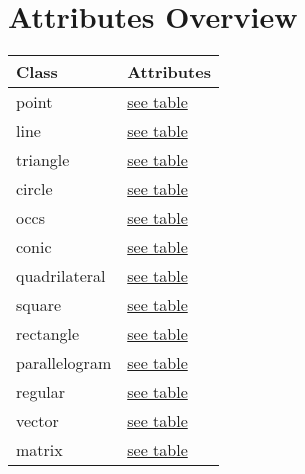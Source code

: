 \documentclass[
  DIV=14,
  fontsize=10,
  index=totoc,
  twoside,
  cadre,
  headings=small
]{tkz-doc}
\begin{document}
\clearpage
\listofoverviews

\clearpage
\section*{Attributes Overview}
\begin{tabular}{ll}
\textbf{Class} & \textbf{Attributes} \\
\hline
point & \hyperref[point:attributes]{see table}       \\
line & \hyperref[line:attributes]{see table}         \\
triangle & \hyperref[triangle:attributes]{see table} \\
circle & \hyperref[circle:attributes]{see table}     \\
occs & \hyperref[occs:attributes]{see table}         \\
conic & \hyperref[conic:attributes]{see table}       \\
quadrilateral & \hyperref[quadrilateral:attributes]{see table}\\
square & \hyperref[square:attributes]{see table}     \\
rectangle & \hyperref[rectangle:attributes]{see table}\\
parallelogram & \hyperref[parallelogram:attributes]{see table}\\
regular & \hyperref[regular:attributes]{see table}   \\
vector & \hyperref[vector:attributes]{see table}     \\
matrix & \hyperref[matrix:attributes]{see table}     \\
\end{tabular}
\end{document}
